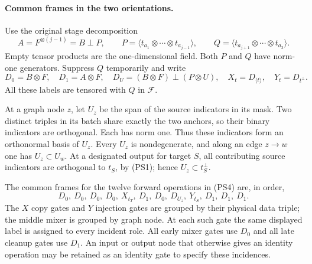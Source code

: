\paragraph{Common frames in the two orientations.}
Use the original stage decomposition
\[
 A=F^{\otimes(j-1)}=B\mathbin\perp P,
 \qquad P=\langle t_{a_1}\otimes\cdots\otimes t_{a_{j-1}}\rangle,
 \qquad Q=\langle t_{a_{j+1}}\otimes\cdots\otimes t_{a_3}\rangle.
\]
Empty tensor products are the one-dimensional field.  Both $P$ and $Q$
have norm-one generators.  Suppress $Q$ temporarily and write
\[
 D_0=B\otimes F,\quad D_1=A\otimes F,\quad
 D_U=(B\otimes F)\mathbin\perp(P\otimes U),
 \quad X_t=D_{\langle t\rangle},\quad Y_t=D_{t^\perp}.
\]
All these labels are tensored with $Q$ in $\mathcal F$.

At a graph node $z$, let $U_z$ be the span of the source indicators in
its mask.  Two distinct triples in its batch share exactly the two anchors,
so their binary indicators are orthogonal.  Each has norm one.  Thus
these indicators form an orthonormal basis of $U_z$.  Every $U_z$ is
nondegenerate, and along an edge $z\to w$ one has $U_z\subset U_w$.
At a designated output for target $S$, all contributing source indicators
are orthogonal to $t_S$, by (PS1); hence $U_z\subset t_S^\perp$.

The common frames for the twelve forward operations in (PS4) are, in order,
\[
 D_0,\ D_0,\ D_0,\ D_0,\ X_{t_T},\ D_1,\ D_0,\
 D_{U_z},\ Y_{t_S},\ D_1,\ D_1,\ D_1.                          \tag{PS6}
\]
The $X$ copy gates and $Y$ injection gates are grouped by their physical
data triple; the middle mixer is grouped by graph node.  At each such
gate the same displayed label is assigned to every incident role.
All early mixer gates use $D_0$ and all late cleanup gates use $D_1$.
An input or output node that otherwise gives an identity operation may
be retained as an identity gate to specify these incidences.

